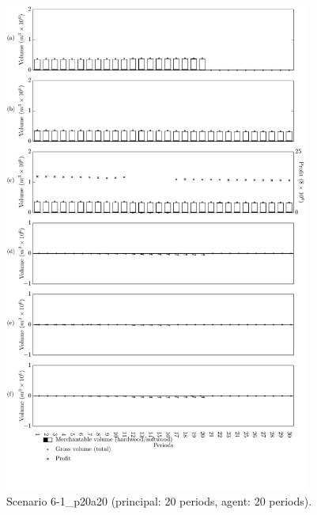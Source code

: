 \begin{figure}[h]
  \centering
  \includegraphics[width=10cm]{images/appendix/s6-1_p20a20}
  \caption{Scenario 6-1\_p20a20 (principal: 20 periods, agent: 20 periods).}
  \label{fig:s6-1_p20a20}
\end{figure}

